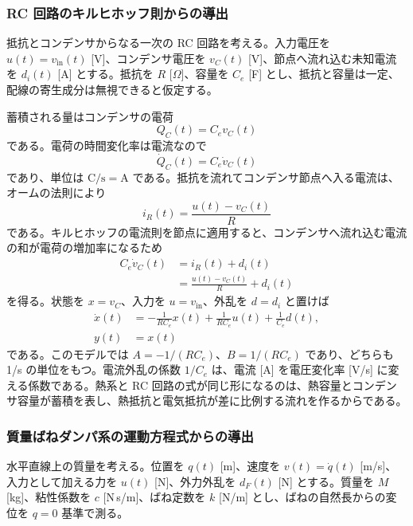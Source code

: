 \subsubsection{RC 回路のキルヒホッフ則からの導出}

抵抗とコンデンサからなる一次の RC 回路を考える。入力電圧を $u(t)=v_{\mathrm{in}}(t)$ [V]、コンデンサ電圧を $v_C(t)$ [V]、節点へ流れ込む未知電流を $d_i(t)$ [A] とする。抵抗を $R$ [$\Omega$]、容量を $C_e$ [F] とし、抵抗と容量は一定、配線の寄生成分は無視できると仮定する。

蓄積される量はコンデンサの電荷
\begin{equation}
  Q_C(t)=C_e v_C(t)
\end{equation}
である。電荷の時間変化率は電流なので
\begin{equation}
  \dot{Q}_C(t)=C_e\dot{v}_C(t)
\end{equation}
であり、単位は $\mathrm{C/s}=\mathrm{A}$ である。抵抗を流れてコンデンサ節点へ入る電流は、オームの法則により
\begin{equation}
  i_R(t)=\frac{u(t)-v_C(t)}{R}
\end{equation}
である。キルヒホッフの電流則を節点に適用すると、コンデンサへ流れ込む電流の和が電荷の増加率になるため
\begin{align}
  C_e\dot{v}_C(t)&=i_R(t)+d_i(t)\\
  &=\frac{u(t)-v_C(t)}{R}+d_i(t)
\end{align}
を得る。状態を $x=v_C$、入力を $u=v_{\mathrm{in}}$、外乱を $d=d_i$ と置けば
\begin{align}
  \dot{x}(t)&=-\frac{1}{RC_e}x(t)+\frac{1}{RC_e}u(t)+\frac{1}{C_e}d(t),\\
  y(t)&=x(t)
\end{align}
である。このモデルでは $A=-1/(RC_e)$、$B=1/(RC_e)$ であり、どちらも 1/s の単位をもつ。電流外乱の係数 $1/C_e$ は、電流 [A] を電圧変化率 [V/s] に変える係数である。熱系と RC 回路の式が同じ形になるのは、熱容量とコンデンサ容量が蓄積を表し、熱抵抗と電気抵抗が差に比例する流れを作るからである。

\subsubsection{質量ばねダンパ系の運動方程式からの導出}

水平直線上の質量を考える。位置を $q(t)$ [m]、速度を $v(t)=\dot{q}(t)$ [m/s]、入力として加える力を $u(t)$ [N]、外力外乱を $d_F(t)$ [N] とする。質量を $M$ [kg]、粘性係数を $c$ [N\,s/m]、ばね定数を $k$ [N/m] とし、ばねの自然長からの変位を $q=0$ 基準で測る。

